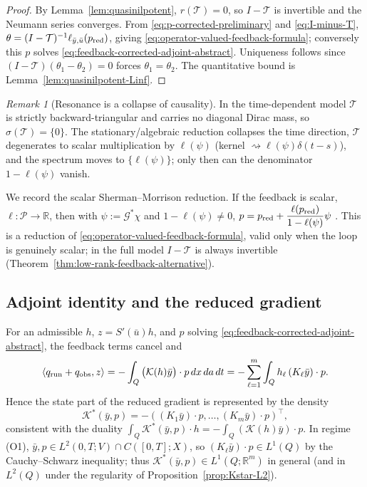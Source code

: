 \documentclass[pdflatex,sn-mathphys-num]{sn-jnl}
\theoremstyle{plain}
\theoremstyle{definition}
\theoremstyle{remark}
\newtheorem{remark}[theorem]{Remark}
\newcommand{\R}{\mathbb R}
\begin{document}
\begin{proof}
By Lemma~\ref{lem:quasinilpotent}, $r(\mathcal T)=0$, so $I-\mathcal T$ is
invertible and the Neumann series converges. From
\eqref{eq:p-corrected-preliminary} and \eqref{eq:I-minus-T},
$\theta=(I-\mathcal T)^{-1}\ell_{\bar y,\bar u}(p_{\rm red})$, giving
\eqref{eq:operator-valued-feedback-formula}; conversely this $p$ solves
\eqref{eq:feedback-corrected-adjoint-abstract}. Uniqueness follows since
$(I-\mathcal T)(\theta_1-\theta_2)=0$ forces $\theta_1=\theta_2$. The
quantitative bound is Lemma~\ref{lem:quasinilpotent-Linf}.
\end{proof}

\begin{remark}[Resonance is a collapse of causality]
\label{rem:resonance-collapse}
In the time-dependent model $\mathcal T$ is strictly backward-triangular and
carries no diagonal Dirac mass, so $\sigma(\mathcal T)=\{0\}$. The
stationary/algebraic reduction collapses the time direction, $\mathcal T$
degenerates to scalar multiplication by $\ell(\psi)$
(kernel $\rightsquigarrow\ell(\psi)\delta(t-s)$), and the spectrum moves to
$\{\ell(\psi)\}$; only then can the denominator $1-\ell(\psi)$ vanish.
\end{remark}

We record the scalar Sherman--Morrison reduction.
If the feedback is scalar, $\ell:\mathcal P\to\R$, then with
$\psi:=\mathcal G^*\chi$ and $1-\ell(\psi)\neq0$,
$\displaystyle p=p_{\rm red}+\frac{\ell(p_{\rm red})}{1-\ell(\psi)}\psi$ .
This is a reduction of \eqref{eq:operator-valued-feedback-formula}, valid only
when the loop is genuinely scalar; in the full model $I-\mathcal T$ is always
invertible (Theorem~\ref{thm:low-rank-feedback-alternative}).

\subsection{Adjoint identity and the reduced gradient}
\label{subsec:adjoint-gradient-identity}
For an admissible $h$, $z=S'(\bar u)h$, and $p$ solving
\eqref{eq:feedback-corrected-adjoint-abstract}, the feedback terms cancel and
\begin{equation}
\label{eq:adjoint-gradient-identity}
\langle q_{\rm run}+q_{\rm obs},z\rangle
=
-
\int_Q\big(\mathcal K(h)\bar y\big)\cdot p\,dx\,da\,dt
=
-\sum_{\ell=1}^m\int_Q h_\ell\,(K_\ell\bar y)\cdot p .
\end{equation}
Hence the state part of the reduced gradient is represented by the density
\begin{equation}
\label{eq:state-gradient-representation}
\mathcal K^*(\bar y,p)
=
-\left(
(K_1\bar y)\cdot p,\ldots,(K_m\bar y)\cdot p
\right)^\top ,
\end{equation}
consistent with the duality
$\int_Q\mathcal K^*(\bar y,p)\cdot h=-\int_Q(\mathcal K(h)\bar y)\cdot p$. In
regime (O1), $\bar y,p\in L^2(0,T;V)\cap C([0,T];X)$, so
$(K_\ell\bar y)\cdot p\in L^1(Q)$ by the Cauchy--Schwarz inequality; thus
$\mathcal K^*(\bar y,p)\in L^1(Q;\R^m)$ in general (and in $L^2(Q)$ under the
regularity of Proposition~\ref{prop:Kstar-L2}).
\end{document}
